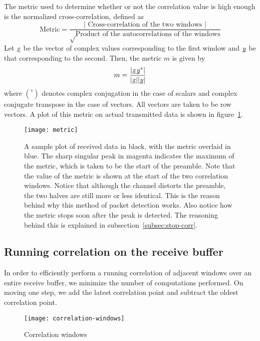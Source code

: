 The metric used to determine whether or not the correlation value is high
enough is the normalized cross-correlation, defined as
$$ \text{Metric} = \frac{|\text{ Cross-correlation of the two windows }|}
                        {\sqrt\text{Product of the autocorrelations of the
                                    windows}}
$$
Let $\underbar{\emph{x}}$ be the vector of complex values corresponding to the first window
and $\underbar{\emph{y}}$ be that corresponding to the second. Then, the metric $m$ is
given by
\begin{equation} \label{eqn:old-metric}
	m = \frac{|\corr{\ue{x}}{\ue{y}}|}{|\ue{x}||\ue{y}|}
\end{equation}
where $(^*)$ denotes complex conjugation in the case of scalars and complex
conjugate transpose in the case of vectors. All vectors are taken to be row
vectors. A plot of this metric on actual transmitted data is shown in
figure~\ref{fig:metric}.

\begin{figure}[h]
	\centering
	\texttt{[image: metric]}
	\caption{A sample plot of received data in black, with the metric overlaid
	         in blue. The sharp singular peak in magenta indicates the maximum
	         of the metric, which is taken to be the start of the preamble.
	         Note that the value of the metric is shown at the start of the two
	         correlation windows. Notice that although the channel distorts the
	         preamble, the two halves are still more or less identical. This is
	         the reason behind why this method of packet detection works. Also
	         notice how the metric stops soon after the peak is detected. The
	         reasoning behind this is explained in
	         subsection~\ref{subsec:stop-corr}.}
	\label{fig:metric}
\end{figure}

\subsection{Running correlation on the receive buffer}

In order to efficiently perform a running correlation of adjacent windows over
an entire receive buffer, we minimize the number of computations performed. On
moving one step, we add the latest correlation point and subtract the oldest
correlation point.

\begin{figure}[h]
	\centering
	\texttt{[image: correlation-windows]}
	\caption{Correlation windows}
	\label{fig:corr-win}
\end{figure}


